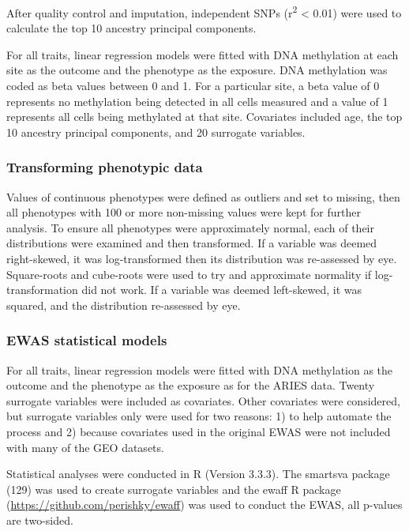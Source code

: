 \documentclass[11pt,oneside]{bristolthesis}
\begin{document}
After quality control and imputation, independent SNPs (r\textsuperscript{2} \textless{} 0.01) were used to calculate the top 10 ancestry principal components.

For all traits, linear regression models were fitted with DNA methylation at each site as the outcome and the phenotype as the exposure. DNA methylation was coded as beta values between 0 and 1. For a particular site, a beta value of 0 represents no methylation being detected in all cells measured and a value of 1 represents all cells being methylated at that site. Covariates included age, the top 10 ancestry principal components, and 20 surrogate variables.

\hypertarget{transforming-phenotypic-data}{%
\subsubsection{Transforming phenotypic data}\label{transforming-phenotypic-data}}

Values of continuous phenotypes were defined as outliers and set to missing, then all phenotypes with 100 or more non-missing values were kept for further analysis. To ensure all phenotypes were approximately normal, each of their distributions were examined and then transformed. If a variable was deemed right-skewed, it was log-transformed then its distribution was re-assessed by eye. Square-roots and cube-roots were used to try and approximate normality if log-transformation did not work. If a variable was deemed left-skewed, it was squared, and the distribution re-assessed by eye.

\hypertarget{ewas-statistical-models}{%
\subsubsection{EWAS statistical models}\label{ewas-statistical-models}}

For all traits, linear regression models were fitted with DNA methylation as the outcome and the phenotype as the exposure as for the ARIES data. Twenty surrogate variables were included as covariates. Other covariates were considered, but surrogate variables only were used for two reasons: 1) to help automate the process and 2) because covariates used in the original EWAS were not included with many of the GEO datasets.

Statistical analyses were conducted in R (Version 3.3.3). The smartsva package (129) was used to create surrogate variables and the ewaff R package (\url{https://github.com/perishky/ewaff}) was used to conduct the EWAS, all p-values are two-sided.
\end{document}
